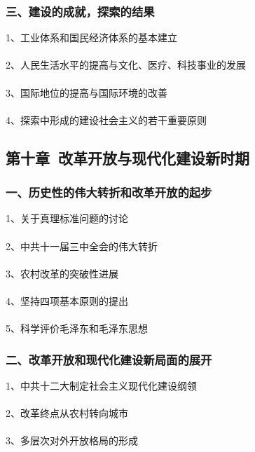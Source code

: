 \documentclass{ctexart}
\begin{document}
\subsubsection{三、建设的成就，探索的结果}

1、工业体系和国民经济体系的基本建立
\\\\

2、人民生活水平的提高与文化、医疗、科技事业的发展
\\\\

3、国际地位的提高与国际环境的改善
\\\\

4、探索中形成的建设社会主义的若干重要原则

\subsection{第十章\ 改革开放与现代化建设新时期}
\subsubsection{一、历史性的伟大转折和改革开放的起步}

1、关于真理标准问题的讨论
\\\\

2、中共十一届三中全会的伟大转折
\\\\

3、农村改革的突破性进展
\\\\

4、坚持四项基本原则的提出
\\\\

5、科学评价毛泽东和毛泽东思想



\subsubsection{二、改革开放和现代化建设新局面的展开}

1、中共十二大制定社会主义现代化建设纲领
\\\\

2、改革终点从农村转向城市
\\\\

3、多层次对外开放格局的形成
\\\\
\end{document}
